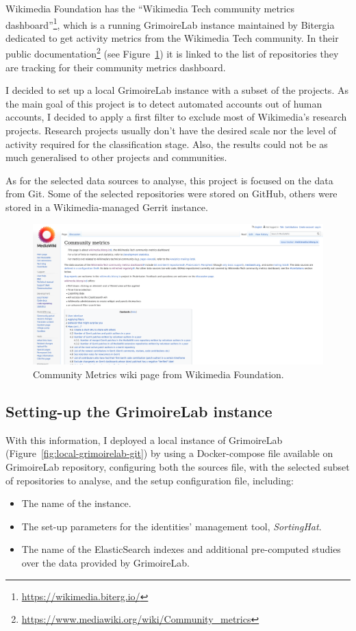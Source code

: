 \documentclass[a4paper, 12pt]{book}
\begin{document}
Wikimedia Foundation has the ``Wikimedia Tech community metrics dashboard''\footnote{\url{https://wikimedia.biterg.io/}}, which is a running GrimoireLab instance maintained by Bitergia dedicated to get activity metrics from the Wikimedia Tech community. In their public documentation\footnote{\url{https://www.mediawiki.org/wiki/Community_metrics}} (see Figure~\ref{fig:wikimedia-wiki}) it is linked to the list of repositories they are tracking for their community metrics dashboard.

I decided to set up a local GrimoireLab instance with a subset of the projects. As the main goal of this project is to detect automated accounts out of human accounts, I decided to apply a first filter to exclude most of Wikimedia's research projects. Research projects usually don't have the desired scale nor the level of activity required for the classification stage. Also, the results could not be as much generalised to other projects and communities.

As for the selected data sources to analyse, this project is focused on the data from Git. Some of the selected repositories were stored on GitHub, others were stored in a Wikimedia-managed Gerrit instance.

\begin{figure}
 \centering
  \includegraphics[width=15cm, keepaspectratio]{img/community-metrics-wiki.png}
  \caption{Community Metrics wiki page from Wikimedia Foundation.}
  \label{fig:wikimedia-wiki}
\end{figure}

\subsection{Setting-up the GrimoireLab instance}
\label{ssec:setting-grimoirelab}

With this information, I deployed a local instance of GrimoireLab (Figure~\ref{fig:local-grimoirelab-git}) by using a Docker-compose file available on GrimoireLab repository, configuring both the sources file, with the selected subset of repositories to analyse, and the setup configuration file, including:
\begin{itemize}
    \item The name of the instance.
    \item The set-up parameters for the identities' management tool, \emph{SortingHat}.
    \item The name of the ElasticSearch indexes and additional pre-computed studies over the data provided by GrimoireLab.
\end{itemize}
\end{document}
